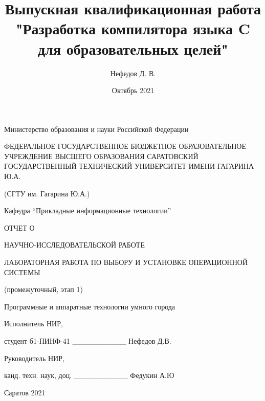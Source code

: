 \documentclass[14pt,russian]{extarticle}
\title{Выпускная квалификационная работа "Разработка компилятора языка C для
образовательных целей"}
\author{Нефедов Д. В.}
\date{Октябрь 2021}
\begin{document}
\begin{titlepage}
	\begin{center}
		\singlespacing

		Министерство образования и науки Российской Федерации

		\MakeUppercase{Федеральное государственное бюджетное
		образовательное учреждение высшего образования Саратовский
		Государственный Технический Университет имени Гагарина Ю.А.}

		(СГТУ им. Гагарина Ю.А.)

		\bigskip
		\bigskip

		Кафедра ``Прикладные информационные технологии''

		\bigskip
		\bigskip
		\bigskip
		\bigskip
		\bigskip
		\bigskip
		\bigskip
		\bigskip

		\singlespacing

		ОТЧЕТ О

		НАУЧНО-ИССЛЕДОВАТЕЛЬСКОЙ РАБОТЕ

		\MakeUppercase{Лабораторная работа по выбору и установке
		операционной системы}

		\onehalfspacing
	
		(промежуточный, этап 1)

		\bigskip
		\bigskip

		Программные и аппаратные технологии умного города
	\end{center}

	\bigskip
	\bigskip

	\begin{flushleft}
		\singlespacing

		Исполнитель НИР,

		студент б1-ПИНФ-41 \_\_\_\_\_\_\_\_\_\_ Нефедов Д.В.

		\singlespacing

		Руководитель НИР,

		канд. техн. наук, доц. \_\_\_\_\_\_\_\_\_\_ Федукин А.Ю

	\end{flushleft}

	\vfill
	\centerline{Саратов 2021}
\end{titlepage}

\end{document}
